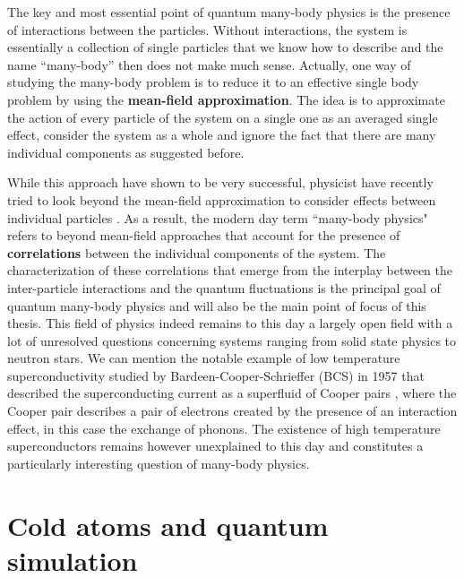 The key and most essential point of quantum many-body physics is the presence of interactions between the particles. Without interactions, the system is essentially a collection of single particles that we know how to describe and the name ``many-body'' then does not make much sense. Actually, one way of studying the many-body problem is to reduce it to an effective single body problem by using the \textbf{mean-field approximation}. The idea is to approximate the action of every particle of the system on a single one as an averaged single effect, \ie consider the system as a whole and ignore the fact that there are many individual components as suggested before.

While this approach have shown to be very successful, physicist have recently tried to look beyond the mean-field approximation to consider effects between individual particles \cite{lavoine2021,papp2008bragg,schweigler2017experimental,wenz2013few}. As a result, the modern day term ``many-body physics" refers to beyond mean-field approaches that account for the presence of \textbf{correlations} between the individual components of the system. The characterization of these correlations that emerge from the interplay between the inter-particle interactions and the quantum fluctuations is the principal goal of quantum many-body physics and will also be the main point of focus of this thesis. This field of physics indeed remains to this day a largely open field with a lot of unresolved questions concerning systems ranging from solid state physics to neutron stars. We can mention the notable example of low temperature superconductivity studied by Bardeen-Cooper-Schrieffer \cite{bardeen1957theory} (BCS) in 1957 that described the superconducting current as a superfluid of Cooper pairs \cite{cooper1956bound}, where the Cooper pair describes a pair of electrons created by the presence of an interaction effect, in this case the exchange of phonons. The existence of high temperature superconductors remains however unexplained to this day and constitutes a particularly interesting question of many-body physics.

\section*{Cold atoms and quantum simulation}

